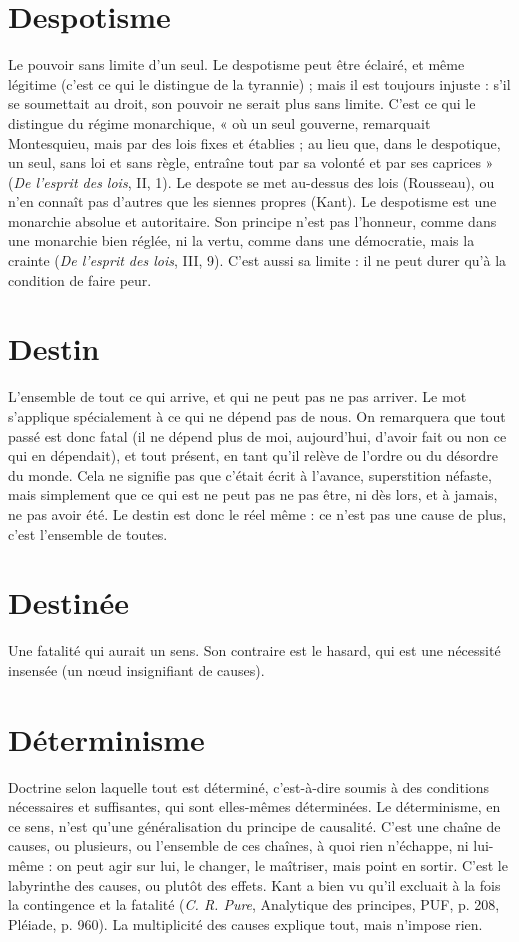 \section{Despotisme}
Le pouvoir sans limite d’un seul.
Le despotisme peut être éclairé, et même légitime (c’est ce
qui le distingue de la tyrannie) ; mais il est toujours injuste : s’il se soumettait
au droit, son pouvoir ne serait plus sans limite. C’est ce qui le distingue du
régime monarchique, « où un seul gouverne, remarquait Montesquieu, mais
par des lois fixes et établies ; au lieu que, dans le despotique, un seul, sans loi et
sans règle, entraîne tout par sa volonté et par ses caprices » ({\it De l'esprit des lois},
II, 1). Le despote se met au-dessus des lois (Rousseau), ou n’en connaît pas
d’autres que les siennes propres (Kant). Le despotisme est une monarchie
absolue et autoritaire. Son principe n’est pas l’honneur, comme dans une
monarchie bien réglée, ni la vertu, comme dans une démocratie, mais la crainte
({\it De l'esprit des lois}, III, 9). C’est aussi sa limite : il ne peut durer qu’à la
condition de faire peur.

\section{Destin}
L'ensemble de tout ce qui arrive, et qui ne peut pas ne pas arriver.
Le mot s'applique spécialement à ce qui ne dépend pas de nous.
On remarquera que tout passé est donc fatal (il ne dépend plus de moi,
aujourd’hui, d’avoir fait ou non ce qui en dépendait), et tout présent, en tant
qu’il relève de l’ordre ou du désordre du monde. Cela ne signifie pas que c’était
écrit à l’avance, superstition néfaste, mais simplement que ce qui est ne peut
pas ne pas être, ni dès lors, et à jamais, ne pas avoir été. Le destin est donc le
réel même : ce n’est pas une cause de plus, c’est l’ensemble de toutes.

\section{Destinée}
Une fatalité qui aurait un sens. Son contraire est le hasard, qui
est une nécessité insensée (un nœud insignifiant de causes).

\section{Déterminisme}
Doctrine selon laquelle tout est déterminé, c’est-à-dire
soumis à des conditions nécessaires et suffisantes, qui
sont elles-mêmes déterminées. Le déterminisme, en ce sens, n’est qu’une
généralisation du principe de causalité. C’est une chaîne de causes, ou plusieurs, ou
l’ensemble de ces chaînes, à quoi rien n’échappe, ni lui-même : on peut agir sur
lui, le changer, le maîtriser, mais point en sortir. C’est le labyrinthe des causes,
ou plutôt des effets. Kant a bien vu qu’il excluait à la fois la contingence et la
fatalité ({\it C. R. Pure}, Analytique des principes, PUF, p. 208, Pléiade, p. 960). La
multiplicité des causes explique tout, mais n’impose rien.

